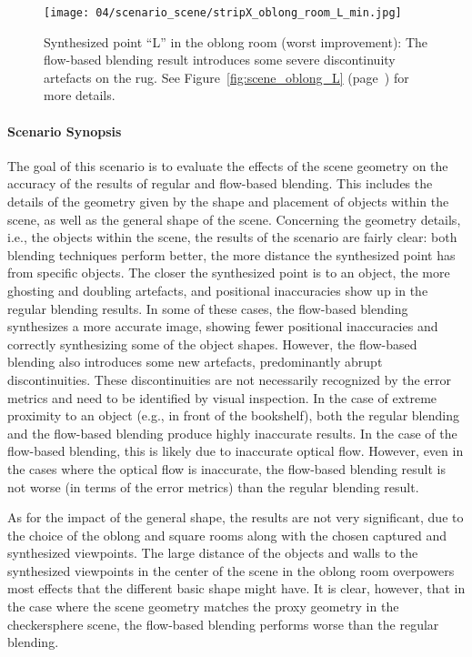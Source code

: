 \begin{figure}
  \centering
  \texttt{[image: 04/scenario\_scene/stripX\_oblong\_room\_L\_min.jpg]}
  \caption[Bottom face of viewpoint ``L'' in the oblong room]{Synthesized point ``L'' in the oblong room (worst improvement): The flow-based blending result introduces some severe discontinuity artefacts on the rug. See Figure~\ref{fig:scene_oblong_L} (page~\pageref{fig:scene_oblong_L}) for more details.}
  \label{fig:scene_oblong_L_min}
\end{figure}

\paragraph{Scenario Synopsis}
The goal of this scenario is to evaluate the effects of the scene geometry on the accuracy of the results of regular and flow-based blending. This includes the details of the geometry given by the shape and placement of objects within the scene, as well as the general shape of the scene.
Concerning the geometry details, i.e., the objects within the scene, the results of the scenario are fairly clear: both blending techniques perform better, the more distance the synthesized point has from specific objects. The closer the synthesized point is to an object, the more ghosting and doubling artefacts, and positional inaccuracies show up in the regular blending results.
In some of these cases, the flow-based blending synthesizes a more accurate image, showing fewer positional inaccuracies and correctly synthesizing some of the object shapes. However, the flow-based blending also introduces some new artefacts, predominantly abrupt discontinuities. These discontinuities are not necessarily recognized by the error metrics and need to be identified by visual inspection. In the case of extreme proximity to an object (e.g., in front of the bookshelf), both the regular blending and the flow-based blending produce highly inaccurate results. In the case of the flow-based blending, this is likely due to inaccurate optical flow. However, even in the cases where the optical flow is inaccurate, the flow-based blending result is not worse (in terms of the error metrics) than the regular blending result.

As for the impact of the general shape, the results are not very significant, due to the choice of the oblong and square rooms along with the chosen captured and synthesized viewpoints. The large distance of the objects and walls to the synthesized viewpoints in the center of the scene in the oblong room overpowers most effects that the different basic shape might have. It is clear, however, that in the case where the scene geometry matches the proxy geometry in the checkersphere scene, the flow-based blending performs worse than the regular blending.























